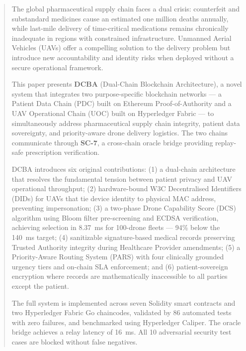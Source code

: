 \documentclass[sigplan,screen,review=false]{acmart}
\begin{document}
\begin{abstract}
The global pharmaceutical supply chain faces a dual crisis: counterfeit
and substandard medicines cause an estimated one million deaths annually,
while last-mile delivery of time-critical medications remains
chronically inadequate in regions with constrained infrastructure.
Unmanned Aerial Vehicles (UAVs) offer a compelling solution to the
delivery problem but introduce new accountability and identity risks
when deployed without a secure operational framework.

This paper presents \textbf{DCBA} (Dual-Chain Blockchain Architecture),
a novel system that integrates two purpose-specific blockchain networks
--- a Patient Data Chain (PDC) built on Ethereum Proof-of-Authority and
a UAV Operational Chain (UOC) built on Hyperledger Fabric --- to
simultaneously address pharmaceutical supply chain integrity, patient
data sovereignty, and priority-aware drone delivery logistics. The two
chains communicate through \textbf{SC-7}, a cross-chain oracle bridge
providing replay-safe prescription verification.

DCBA introduces six original contributions: (1) a dual-chain
architecture that resolves the fundamental tension between patient
privacy and UAV operational throughput; (2) hardware-bound W3C
Decentralised Identifiers (DIDs) for UAVs that tie device identity to
physical MAC address, preventing impersonation; (3) a two-phase Drone
Capability Score (DCS) algorithm using Bloom filter pre-screening and
ECDSA verification, achieving selection in 8.37~ms for 100-drone fleets
--- 94\% below the 140~ms target; (4) sanitizable signature-based
medical records preserving Trusted Authority integrity during Healthcare
Provider amendments; (5) a Priority-Aware Routing System (PARS) with
four clinically grounded urgency tiers and on-chain SLA enforcement;
and (6) patient-sovereign encryption where records are mathematically
inaccessible to all parties except the patient.

The full system is implemented across seven Solidity smart contracts and
two Hyperledger Fabric Go chaincodes, validated by 86 automated tests
with zero failures, and benchmarked using Hyperledger Caliper. The
oracle bridge achieves a relay latency of 16~ms. All 10 adversarial
security test cases are blocked without false negatives.
\end{abstract}
\end{document}
